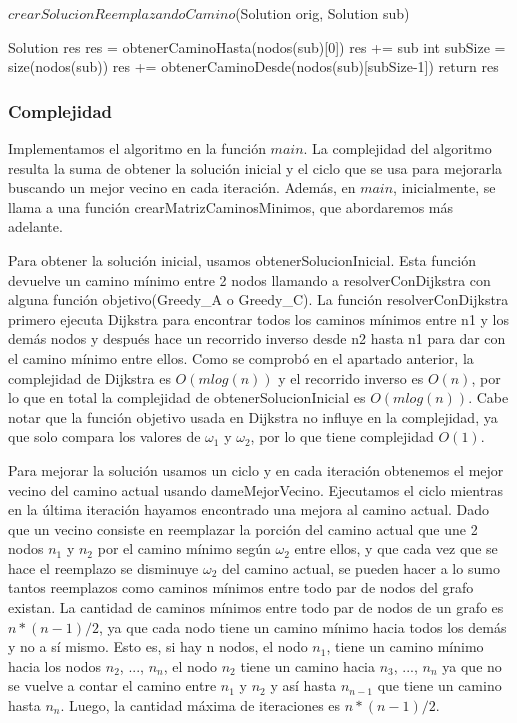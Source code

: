 \begin{algorithm}[H]
\caption{$crearSolucionReemplazandoCamino$(Solution orig, Solution sub)}
\begin{algorithmic}[1]	
	 \State Solution res
	 \State res = obtenerCaminoHasta(nodos(sub)[0])
	 \State res += sub
	 \State int subSize = size(nodos(sub))
	 \State res += obtenerCaminoDesde(nodos(sub)[subSize-1])	  
	\State return res
\end{algorithmic}
\end{algorithm}

\subsubsection{Complejidad}

Implementamos el algoritmo en la función $main$. La complejidad del algoritmo resulta la suma de obtener la solución inicial y el ciclo que se usa para mejorarla buscando un mejor vecino en cada iteración. 
Además, en $main$, inicialmente, se llama a una función crearMatrizCaminosMinimos, que abordaremos más adelante.

Para obtener la solución inicial, usamos obtenerSolucionInicial. Esta función devuelve un camino mínimo entre 2 nodos llamando a resolverConDijkstra con alguna función objetivo(Greedy\_A o Greedy\_C). La función resolverConDijkstra primero ejecuta Dijkstra para encontrar todos los caminos mínimos entre n1 y los demás nodos y después hace un recorrido inverso  desde n2 hasta n1 para dar con el camino mínimo entre ellos. Como se comprobó en el apartado anterior, la complejidad de Dijkstra es $O(m log(n))$ y el recorrido inverso es $O(n)$, por lo que en total la complejidad de obtenerSolucionInicial es $O(m log(n))$. Cabe notar que la función objetivo usada en Dijkstra no influye en la complejidad, ya que solo compara los valores de $\omega_1$ y $\omega_2$, por lo que tiene complejidad $O(1)$.

Para mejorar la solución usamos un ciclo y en cada iteración obtenemos el mejor vecino del camino actual usando dameMejorVecino. Ejecutamos el ciclo mientras en la última iteración hayamos encontrado una mejora al camino actual. 
Dado que un vecino consiste en reemplazar la porción del camino actual que une 2 nodos $n_1$ y $n_2$ por el camino mínimo según $\omega_2$ entre ellos, y que cada vez que se hace el reemplazo se disminuye $\omega_2$ del camino actual, se pueden hacer a lo sumo tantos reemplazos como caminos mínimos entre todo par de nodos del grafo existan. 
La cantidad de caminos mínimos entre todo par de nodos de un grafo es $n * (n-1) / 2$, ya que cada nodo tiene un camino mínimo hacia todos los demás y no a sí mismo. Esto es, si hay n nodos, el nodo $n_1$, tiene un camino mínimo hacia los nodos $n_2$, ..., $n_n$, el nodo $n_2$ tiene un camino hacia $n_3$, ..., $n_n$ ya que no se vuelve a contar el camino entre $n_1$ y $n_2$ y así hasta $n_{n-1}$ que tiene un camino hasta $n_n$.
Luego, la cantidad máxima de iteraciones es $n * (n-1) / 2$.

